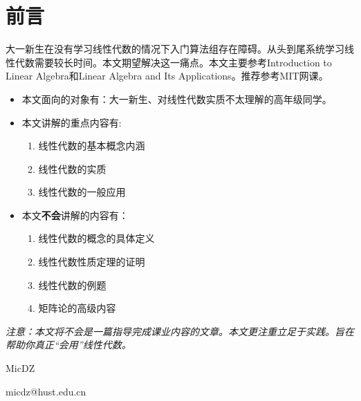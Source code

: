 \chapter{前言}

大一新生在没有学习线性代数的情况下入门算法组存在障碍。从头到尾系统学习线性代数需要较长时间。本文期望解决这一痛点。本文主要参考Introduction to Linear Algebra\cite{strang09}和Linear Algebra and Its Applications\cite{application}。推荐参考MIT网课\cite{MIT}。

\begin{itemize}
	\item 本文面向的对象有：大一新生、对线性代数实质不太理解的高年级同学。
	\item 本文讲解的重点内容有:
	\begin{enumerate}
		\item 线性代数的基本概念内涵
		\item 线性代数的实质
		\item 线性代数的一般应用
	\end{enumerate}
	\item 本文\textbf{不会}讲解的内容有：
	\begin{enumerate}
		\item 线性代数的概念的具体定义
		\item 线性代数性质定理的证明
		\item 线性代数的例题
		\item 矩阵论的高级内容
	\end{enumerate}
\end{itemize}


\textit{注意：本文将不会是一篇指导完成课业内容的文章。本文更注重立足于实践。旨在帮助你真正“会用”线性代数。}
\begin{flushright}
	MicDZ
	
	micdz@hust.edu.cn
\end{flushright}